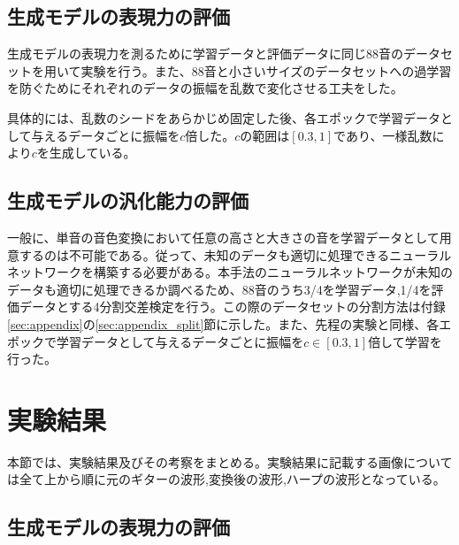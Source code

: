 



\subsection{生成モデルの表現力の評価}

生成モデルの表現力を測るために学習データと評価データに同じ88音のデータセットを用いて実験を行う。また、88音と小さいサイズのデータセットへの過学習を防ぐためにそれぞれのデータの振幅を乱数で変化させる工夫をした。

具体的には、乱数のシードをあらかじめ固定した後、各エポックで学習データとして与えるデータごとに振幅を$c$倍した。$c$の範囲は$[0.3,1]$であり、一様乱数により$c$を生成している。

\subsection{生成モデルの汎化能力の評価}

一般に、単音の音色変換において任意の高さと大きさの音を学習データとして用意するのは不可能である。従って、未知のデータも適切に処理できるニューラルネットワークを構築する必要がある。本手法のニューラルネットワークが未知のデータも適切に処理できるか調べるため、88音のうち3/4を学習データ,1/4を評価データとする4分割交差検定を行う。この際のデータセットの分割方法は付録\ref{sec:appendix}の\ref{sec:appendix_split}節に示した。また、先程の実験と同様、各エポックで学習データとして与えるデータごとに振幅を$c \in [0.3,1]$倍して学習を行った。

\section{実験結果}

本節では、実験結果及びその考察をまとめる。実験結果に記載する画像については全て上から順に元のギターの波形,変換後の波形,ハープの波形となっている。

\subsection{生成モデルの表現力の評価}
\label{sec:expression}

